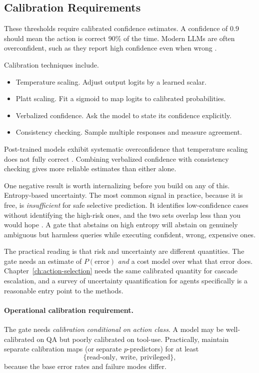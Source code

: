 \subsection{Calibration Requirements}

These thresholds require calibrated confidence estimates. A confidence of 0.9 should mean the action is correct 90\% of the time. Modern LLMs are often overconfident, such as they report high confidence even when wrong \cite{guo2017calibration}.

Calibration techniques include.
\begin{itemize}
\item Temperature scaling. Adjust output logits by a learned scalar.
\item Platt scaling. Fit a sigmoid to map logits to calibrated probabilities.
\item Verbalized confidence. Ask the model to state its confidence explicitly.
\item Consistency checking. Sample multiple responses and measure agreement.
\end{itemize}

Post-trained models exhibit systematic overconfidence that temperature scaling
does not fully correct \cite{tian2023just}. Combining verbalized confidence with
consistency checking gives more reliable estimates than either alone.

One negative result is worth internalizing before you build on any of this.
Entropy-based uncertainty. The most common signal in practice, because it is
free, is \emph{insufficient} for safe selective prediction. It identifies
low-confidence cases without identifying the high-risk ones, and the two sets
overlap less than you would hope \cite{entropyinsuff2026}. A gate that abstains
on high entropy will abstain on genuinely ambiguous but harmless queries while
executing confident, wrong, expensive ones.

The practical reading is that risk and uncertainty are different quantities. The
gate needs an estimate of $P(\text{error})$ \emph{and} a cost model over what
that error does. Chapter~\ref{ch:action-selection} needs the same calibrated
quantity for cascade escalation, and a survey of uncertainty quantification for
agents specifically \cite{uqagents2026} is a reasonable entry point to the
methods.

\paragraph{Operational calibration requirement.}
The gate needs \emph{calibration conditional on action class}. A model may be well-calibrated on QA but poorly calibrated on tool-use. Practically, maintain separate calibration maps (or separate $p$-predictors) for at least
\[
\{\text{read-only},\ \text{write},\ \text{privileged}\},
\]
because the base error rates and failure modes differ.

